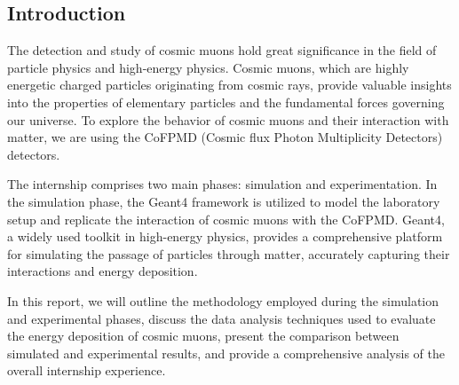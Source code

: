 \documentclass{article}
\begin{document}
\newpage
{}
\begin{center}
 \tableofcontents   
\end{center}
\restoregeometry


\newpage
\begin{multicols}{2}



\section{Introduction}

The detection and study of cosmic muons hold great significance in the field of particle physics 
and high-energy physics. Cosmic muons, which are highly energetic charged particles originating from 
cosmic rays, provide valuable insights into the properties of elementary particles and the fundamental 
forces governing our universe. To explore the behavior of cosmic muons and their interaction with matter, 
we are using the CoFPMD (Cosmic flux Photon Multiplicity Detectors) detectors. 


The internship comprises two main phases: simulation and experimentation. In the 
simulation phase, the Geant4 framework is utilized to model the laboratory setup 
and replicate the interaction of cosmic muons with the CoFPMD. Geant4, a 
widely used toolkit in high-energy physics, provides a comprehensive platform for 
simulating the passage of particles through matter, accurately capturing their interactions 
and energy deposition.


In this report, we will outline the methodology employed during the simulation and 
experimental phases, discuss the data analysis techniques used to evaluate the energy 
deposition of cosmic muons, present the comparison between simulated and experimental 
results, and provide a comprehensive analysis of the overall internship experience.





\end{multicols}
\end{document}
